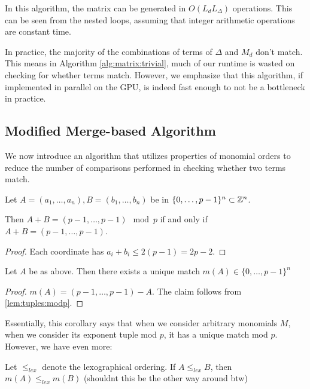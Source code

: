 In this algorithm, the matrix can be generated in 
$O(L_{d}L_{\Delta})$ operations. 
This can be
seen from the nested loops, assuming that integer arithmetic operations are constant time.

In practice, the majority of the combinations of terms of $\Delta$ and $M_{d}$ don't match. This means in
Algorithm \ref{alg:matrix:trivial}, much of our runtime is wasted on checking for whether terms match.
However, we emphasize that this algorithm, if implemented in parallel on the GPU, is indeed
fast enough to not be a bottleneck in practice.

\subsection{Modified Merge-based Algorithm}

We now introduce an algorithm that utilizes properties of monomial orders to reduce the number of comparisons 
performed in checking whether two terms match.

\begin{lem}
	\label{lem:tuples:modp}
	Let \(A = (a_{1}, \ldots, a_{n}),
	B = (b_{1}, \ldots, b_{n})\)
	be in \(\{0, \ldots, p-1\}^{n} \subset \mathbb{Z}^{n}\).

	Then \(A + B = 
	(p-1, \ldots, p-1) \mod p\)
	if and only if 
	\(A + B = 
	(p-1, \ldots, p-1)\).
\end{lem}

\begin{proof}
	Each coordinate has \(a_{i} + b_{i} \leq 2(p-1) = 2p-2\).
\end{proof}

\begin{cor}
    \label{cor:unique:match}
	Let $A$ be as above.
	Then there exists a unique
	match \(m(A) \in \{0, \ldots, p-1\}^{n}\) 
\end{cor}

\begin{proof}
	\(m(A) = 
	(p-1, \ldots, p-1) - A\).
	The claim follows from 
	\ref{lem:tuples:modp}.
\end{proof}

Essentially, this corollary says that
when we consider arbitrary monomials \(M\),
when we consider its exponent tuple 
mod \(p\), it has a unique
match mod \(p\).
However, we have even more:

\begin{cor}
	\label{cor:match:order}
	Let \(\leq_{lex}\) denote the 
	lexographical ordering.
	If \(A \leq_{lex} B\),
	then 
	\(m(A) \leq_{lex} m(B)\)
    (shouldnt this be the other way around btw)
\end{cor}

